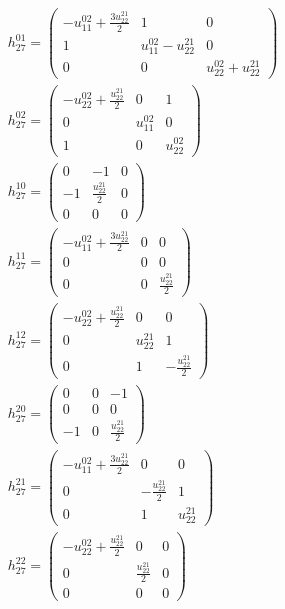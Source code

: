 \documentclass[a4paper, 11pt, twoside, onecolumn]{article}
\begin{document}
\begin{landscape}
\begin{gather*}
	 h_{27}^{01}=\begin{pmatrix}- u^{02}_{11} + \frac{3 u^{21}_{22}}{2} & 1 & 0\\1 & u^{02}_{11} - u^{21}_{22} & 0\\0 & 0 & u^{02}_{22} + u^{21}_{22}\end{pmatrix}\\ 
	 h_{27}^{02}=\begin{pmatrix}- u^{02}_{22} + \frac{u^{21}_{22}}{2} & 0 & 1\\0 & u^{02}_{11} & 0\\1 & 0 & u^{02}_{22}\end{pmatrix}\\ 
	 h_{27}^{10}=\begin{pmatrix}0 & -1 & 0\\-1 & \frac{u^{21}_{22}}{2} & 0\\0 & 0 & 0\end{pmatrix}\\ 
	 h_{27}^{11}=\begin{pmatrix}- u^{02}_{11} + \frac{3 u^{21}_{22}}{2} & 0 & 0\\0 & 0 & 0\\0 & 0 & \frac{u^{21}_{22}}{2}\end{pmatrix}\\ 
	 h_{27}^{12}=\begin{pmatrix}- u^{02}_{22} + \frac{u^{21}_{22}}{2} & 0 & 0\\0 & u^{21}_{22} & 1\\0 & 1 & - \frac{u^{21}_{22}}{2}\end{pmatrix}\\ 
	 h_{27}^{20}=\begin{pmatrix}0 & 0 & -1\\0 & 0 & 0\\-1 & 0 & \frac{u^{21}_{22}}{2}\end{pmatrix}\\ 
	 h_{27}^{21}=\begin{pmatrix}- u^{02}_{11} + \frac{3 u^{21}_{22}}{2} & 0 & 0\\0 & - \frac{u^{21}_{22}}{2} & 1\\0 & 1 & u^{21}_{22}\end{pmatrix}\\ 
	 h_{27}^{22}=\begin{pmatrix}- u^{02}_{22} + \frac{u^{21}_{22}}{2} & 0 & 0\\0 & \frac{u^{21}_{22}}{2} & 0\\0 & 0 & 0\end{pmatrix}\\ 

\end{gather*}
\end{landscape}
\end{document}
